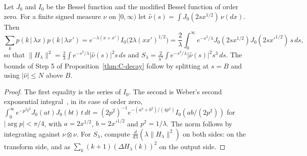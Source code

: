 \begin{lemma}\label{lem:C-hankel}
Let $J_0$ and $I_0$ be the Bessel function and the modified Bessel function of order zero. For a finite signed measure $\nu$ on
$[0,\infty)$ let $\hat\nu(s)=\int J_0(2sx^{1/2})\,\nu(dx)$. Then
\[
\sum_kp(k\,|\,\lambda x)p(k\,|\,\lambda x')=e^{-\lambda(x+x')}I_0\bigl(2\lambda(xx')^{1/2}\bigr)
=\frac2\lambda\int_0^\infty e^{-s^2/\lambda}J_0(2sx^{1/2})J_0(2sx'^{1/2})\,s\,ds,
\]
so that $\|H_\lambda\|^2=\frac2\lambda\int e^{-s^2/\lambda}|\hat\nu(s)|^2s\,ds$ and $S_\lambda=\frac2{\lambda^2}\int e^{-s^2/\lambda}|\hat\nu(s)|^2s^3\,ds$.
The bounds of Step 5 of Proposition~\ref{thm:C-decay} follow by splitting at $s=B$ and using $|\hat\nu|\le N$ above $B$.
\end{lemma}
\begin{proof}
The first equality is the series of $I_0$. The second is Weber's second exponential integral~\cite[13.31(1)]{Watson1922},
in its case of order zero, $\int_0^\infty e^{-p^2t^2}J_0(at)J_0(bt)\,t\,dt=(2p^2)^{-1}e^{-(a^2+b^2)/(4p^2)}I_0(ab/(2p^2))$ for
$|\arg p|<\pi/4$, with $a=2x^{1/2}$, $b=2x'^{1/2}$ and $p^2=1/\lambda$. The norm follows by integrating against
$\nu\otimes\nu$. For $S_\lambda$, compute $\frac{d}{d\lambda}(\lambda\|H_\lambda\|^2)$ on both sides: on the transform side, and as
$\sum_k(k+1)(\Delta H_\lambda(k))^2$ on the output side.
\end{proof}

